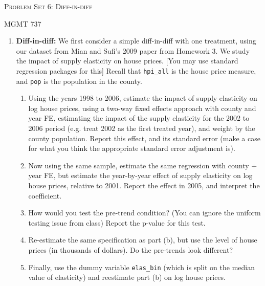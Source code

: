\documentclass[11pt, a4paper]{article}
\begin{document}
\begin{center}
  {\Large \textsc{Problem Set 6: Diff-in-diff}}

  MGMT 737
\end{center}


\begin{enumerate}
\item \textbf{Diff-in-diff:} We first consider a simple diff-in-diff
  with one treatment, using our dataset from Mian and Sufi's 2009
  paper from Homework 3. We study the impact of supply elasticity on
  house prices. [You may use standard regression packages for this]
  Recall that \texttt{hpi\_all} is the house price measure, and
  \texttt{pop} is the population in the county.
  \begin{enumerate}
  \item Using the years 1998 to 2006, estimate the impact of supply
    elasticity on log house prices, using a two-way fixed effects
    approach with county and year FE, estimating the impact of the
    supply elasticity for the 2002 to 2006 period (e.g. treat 2002 as
    the first treated year), and weight by the county
    population. Report this effect, and its standard error (make a
    case for what you think the appropriate standard error adjustment
    is).
  \item Now using the same sample, estimate the same regression with
    county + year FE, but estimate the year-by-year effect of supply
    elasticity on log house prices, relative to 2001. Report the
    effect in 2005, and interpret the coefficient.
  \item How would you test the pre-trend condition? (You can ignore
    the uniform testing issue from class) Report the p-value for this
    test.
  \item Re-estimate the same specification as part (b), but use the
    level of house prices (in thousands of dollars). Do the pre-trends
    look different?
  \item Finally, use the dummy variable \texttt{elas\_bin} (which is
    split on the median value of elasticity) and reestimate part (b)
    on log house prices.
  \end{enumerate}

\end{enumerate}
\end{document}
